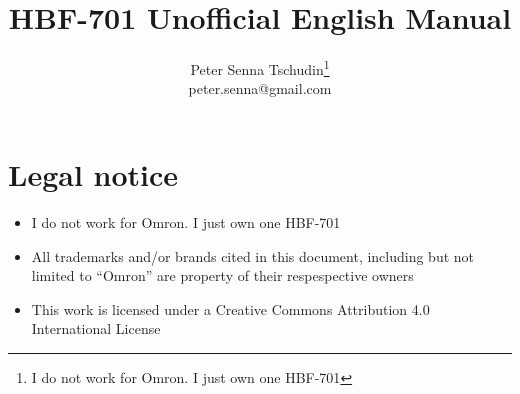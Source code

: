 \documentclass[10pt]{article}
\title{HBF-701 Unofficial English Manual}
\author{Peter Senna Tschudin\footnote{I do not work for Omron. I just own one
HBF-701}\\ {\small peter.senna@gmail.com}}
\begin{document}
\maketitle
\section{Legal notice}
\label{sec:legal}
\begin{itemize}
\item I do not work for Omron. I just own one HBF-701
\item All trademarks and/or brands cited in this document, including but not limited to ``Omron'' are property of their respespective owners
\item This work is licensed under a Creative Commons Attribution 4.0 International License
\end{itemize}
\end{document}
